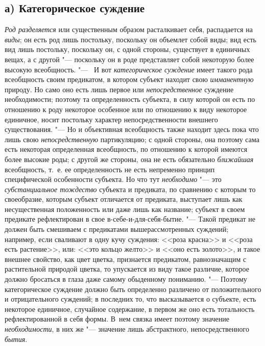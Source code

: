 {\subsection[а) Категорическое суждение]{а) Категорическое суждение}
{\em Род разделяется} или
существенным образом расталкивает себя, распадается на
{\em виды}; он есть род
лишь постольку, поскольку он объемлет собой виды; вид есть вид лишь
постольку, поскольку он, с одной стороны, существует в единичных вещах, а с
другой "--- поскольку он в роде представляет собой некоторую
более высокую всеобщность. "--- \ И вот
{\em категорическое суждение}
имеет такого рода всеобщность своим предикатом, в котором
субъект находит свою {\em имманентную}
природу. Но само оно есть лишь первое или
{\em непосредственное}
суждение необходимости; поэтому та определенность субъекта, в
силу которой он есть по отношению к роду некоторое особенное или по
отношению к виду некоторое единичное, носит постольку характер
непосредственности внешнего существования. "--- Но и
объективная всеобщность также находит здесь пока что лишь
свою {\em непосредственную}
партикуляцию; с одной стороны, она поэтому сама есть
некоторая определенная всеобщность, по отношению к которой имеются более
высокие роды; с другой же стороны, она не есть обязательно
{\em ближайшая}
всеобщность, т.~е. ее определенность не есть непременно
принцип специфической особенности субъекта. Но что тут
{\em необходимо} "--- это
{\em субстанциальное тождество}
субъекта и предиката, по сравнению с которым то своеобразие,
которым субъект отличается от предиката, выступает лишь как несущественная
положенность или даже лишь как название; субъект в своем предикате
рефлектирован в свое в-себе-и-для-себя-бытие. "--- Такой
предикат не должен быть смешиваем с предикатами вышерассмотренных суждений;
например, если сваливают в одну кучу суждения:
<<роза красна>> и
<<роза есть растение>>,
или:
<<это кольцо желто>> и
<<оно есть золото>>,
и такое внешнее свойство, как цвет цветка, признается
предикатом, равнозначащим с растительной природой цветка, то упускается из
виду такое различие, которое должно бросаться в глаза даже самому
обыденному пониманию. "--- Поэтому категорическое суждение
должно быть определенно различено от положительного и отрицательного
суждений; в последних то, что высказывается о субъекте, есть некоторое
единичное, случайное содержание, в первом же оно есть тотальность
рефлектированной в себя формы. В~нем связка имеет поэтому значение
{\em необходимости}, в
них же "--- значение лишь абстрактного, непосредственного
{\em бытия}.

}
